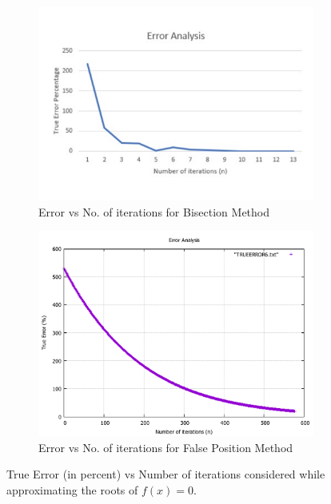 \documentclass[titlepage, 11pt]{article}
\begin{document}
\begin{figure}[ht]
\begin{subfigure}{.5\textwidth}
  \centering
  \includegraphics[width=\linewidth]{TE4a.pdf}
  \caption{Error vs No. of iterations for Bisection Method}
  \label{fig:fig89a}
\end{subfigure}
\begin{subfigure}{.5\textwidth}
  \centering
  \includegraphics[width=\linewidth]{TE4b.pdf}
  \caption{Error vs No. of iterations for False Position Method}
  \label{fig:fig89b}
\end{subfigure}
\caption{True Error (in percent) vs Number of iterations considered while approximating the roots of $f(x)=0$.}
\label{fig:q84}
\end{figure}
\end{document}
